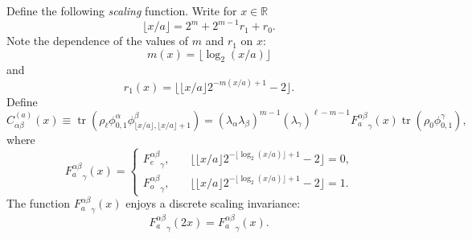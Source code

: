\documentclass[prl,twocolumn,lengthcheck,superscriptaddress]{revtex4-1}
\newcommand{\tr}{\operatorname{tr}}
\theoremstyle{definition}
\theoremstyle{remark}
\begin{document}
Define the following \emph{scaling} function. Write for $x\in \mathbb{R}$
\begin{equation}
	\lfloor x/a \rfloor = 2^m + 2^{m-1}r_1 + r_0.
\end{equation} 
Note the dependence of the values of $m$ and $r_1$ on $x$: 
\begin{equation}
	m(x) = \lfloor \log_2(x/a) \rfloor
\end{equation}
and
\begin{equation}
	r_1(x) = \lfloor \lfloor x/a \rfloor 2^{-m(x/a)+1} - 2 \rfloor.
\end{equation}
Define
\begin{equation}
	C_{\alpha\beta}^{(a)}(x) \equiv \tr(\rho_{\ell}\phi_{0,1}^{\alpha}\phi_{\lfloor x/a \rfloor,\lfloor x/a \rfloor+1}^{\beta}) =  (\lambda_\alpha\lambda_\beta)^{m-1}(\lambda_\gamma)^{\ell-m-1}{F_a^{\alpha\beta}}_\gamma(x)\tr(\rho_{0} \phi_{0,1}^\gamma), 
	\end{equation}
where
\begin{equation}
	{F_a^{\alpha\beta}}_\gamma(x) =  \begin{cases} {F_e^{\alpha\beta}}_\gamma, &\quad \text{$\lfloor \lfloor x/a \rfloor 2^{-\lfloor \log_2(x/a) \rfloor+1} - 2 \rfloor=0$,} \\ 
	{F_o^{\alpha\beta}}_\gamma, &\quad \text{$\lfloor \lfloor x/a \rfloor 2^{-\lfloor \log_2(x/a) \rfloor+1} - 2 \rfloor=1$.}\end{cases}
\end{equation}
The function ${F_a^{\alpha\beta}}_\gamma(x)$ enjoys a discrete scaling invariance:
\begin{equation}
	{F_a^{\alpha\beta}}_\gamma(2 x) = {F_a^{\alpha\beta}}_\gamma(x).
\end{equation}
\end{document}

